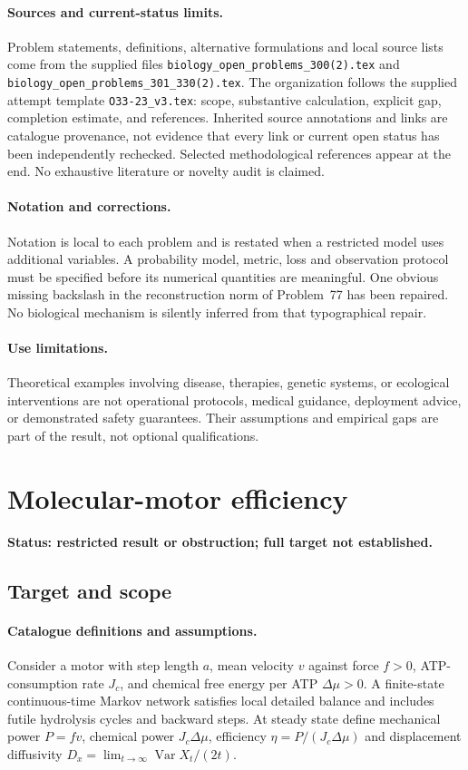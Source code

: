 \documentclass[11pt]{article}
\begin{document}
\paragraph{Sources and current-status limits.}
Problem statements, definitions, alternative formulations and local source lists
come from the supplied files
\texttt{biology\_open\_problems\_300(2).tex} and
\texttt{biology\_open\_problems\_301\_330(2).tex}.
The organization follows the supplied attempt template
\texttt{O33-23\_v3.tex}: scope, substantive calculation, explicit gap,
completion estimate, and references. Inherited source annotations and links are
catalogue provenance, not evidence that every link or current open status has
been independently rechecked. Selected methodological references appear at the
end. No exhaustive literature or novelty audit is claimed.

\paragraph{Notation and corrections.}
Notation is local to each problem and is restated when a restricted model uses
additional variables. A probability model, metric, loss and observation protocol
must be specified before its numerical quantities are meaningful. One obvious
missing backslash in the reconstruction norm of Problem~77 has been repaired.
No biological mechanism is silently inferred from that typographical repair.

\paragraph{Use limitations.}
Theoretical examples involving disease, therapies, genetic systems, or ecological
interventions are not operational protocols, medical guidance, deployment advice,
or demonstrated safety guarantees. Their assumptions and empirical gaps are part
of the result, not optional qualifications.


\section*{Molecular-motor efficiency}
\label{prob:087}
\noindent\textbf{Status: restricted result or obstruction; full target not established.}
\subsection{Target and scope}
\paragraph{Catalogue definitions and assumptions.}
Consider a motor with step length $a$, mean velocity $v$ against force $f>0$, ATP-consumption rate $J_c$, and chemical free energy per ATP $\Delta\mu>0$. A finite-state continuous-time Markov network satisfies local detailed balance and includes futile hydrolysis cycles and backward steps. At steady state define mechanical power $P=fv$, chemical power $J_c\Delta\mu$, efficiency $\eta=P/(J_c\Delta\mu)$ and displacement diffusivity $D_x=\lim_{t\to\infty}\operatorname{Var} X_t/(2t)$.
\end{document}
